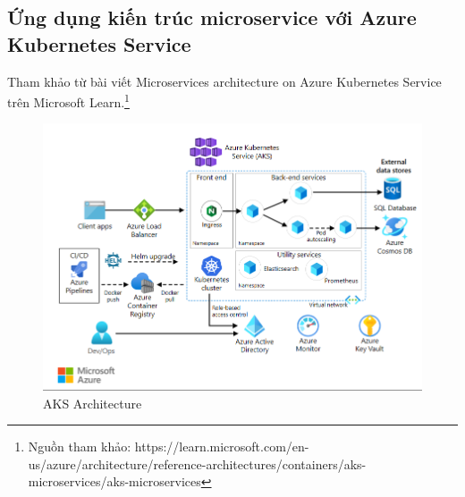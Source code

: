 \subsection{Ứng dụng kiến trúc microservice với Azure Kubernetes Service}
\noindent Tham khảo từ bài viết Microservices architecture on Azure Kubernetes Service trên Microsoft Learn.\footnote{Nguồn tham khảo: https://learn.microsoft.com/en-us/azure/architecture/reference-architectures/containers/aks-microservices/aks-microservices}
\begin{figure}[H]
    \begin{center}
    \includegraphics[scale=0.8]{images/hieu/chap-2/aks-architecture.png}
    \vspace*{5mm}
    \caption{AKS Architecture}
    \end{center}
\end{figure}
